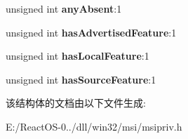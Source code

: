 \begin{DoxyCompactItemize}
\item 
\mbox{\label{structtag_m_s_i_c_o_m_p_o_n_e_n_t_a02ccc8a401373d1f0afa868fcee0d1ce}} 
unsigned int {\bfseries any\+Absent}\+:1
\item 
\mbox{\label{structtag_m_s_i_c_o_m_p_o_n_e_n_t_a0196bb2b75d41abc5f79eb80715de20c}} 
unsigned int {\bfseries has\+Advertised\+Feature}\+:1
\item 
\mbox{\label{structtag_m_s_i_c_o_m_p_o_n_e_n_t_a00dff2328268245000a8b26a29f6b8ae}} 
unsigned int {\bfseries has\+Local\+Feature}\+:1
\item 
\mbox{\label{structtag_m_s_i_c_o_m_p_o_n_e_n_t_a3e8cb90bba5dfbd7ecbc28dd861e37aa}} 
unsigned int {\bfseries has\+Source\+Feature}\+:1
\end{DoxyCompactItemize}


该结构体的文档由以下文件生成\+:\begin{DoxyCompactItemize}
\item 
E\+:/\+React\+O\+S-\/0../dll/win32/msi/msipriv.\+h\end{DoxyCompactItemize}

